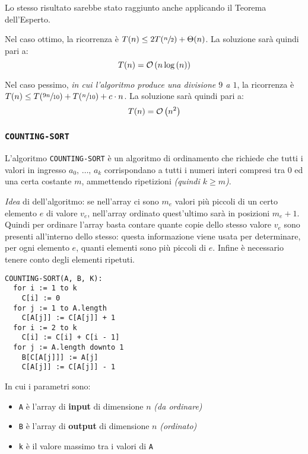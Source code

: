 \documentclass[italian, 10pt]{article}
\begin{document}
\bigskip
Lo stesso risultato sarebbe stato raggiunto anche applicando il Teorema dell'Esperto.

Nel caso ottimo, la ricorrenza è \(T(n) \leq 2T(\sfrac{n}{2}) + \Theta(n)\).
La soluzione sarà quindi pari a: \[ T(n) = \mathcal{O}\left(n \log{(n)}\right) \]

Nel caso pessimo, \textit{in cui l'algoritmo produce una divisione \(9\) a \(1\)}, la ricorrenza è \(T(n) \leq T(\sfrac{9n}{10}) + T(\sfrac{n}{10}) + c \cdot n\).
La soluzione sarà quindi pari a: \[ T(n) = \mathcal{O}\left(n^2\right) \]

\subsubsection{\texttt{COUNTING-SORT}}

L'algoritmo \texttt{COUNTING-SORT} è un algoritmo di ordinamento che richiede che tutti i valori in ingresso \(a_0,\, \ldots,\, a_k\) corrispondano a tutti i numeri interi compresi tra \(0\) ed una certa costante \(m\), ammettendo ripetizioni \textit{(quindi \(k \geq m\))}.

\textit{Idea} di dell'algoritmo:
se nell'array ci sono \(m_e\) valori più piccoli di un certo elemento \(e\) di valore \(v_e\), nell'array ordinato quest'ultimo sarà in posizioni \(m_e + 1\).
Quindi per ordinare l'array basta contare quante copie dello stesso valore \(v_e\) sono presenti all'interno dello stesso: questa informazione viene usata per determinare, per ogni elemento \(e\), quanti elementi sono più piccoli di \(e\).
Infine è necessario tenere conto degli elementi ripetuti.

\begin{lstlisting}[style=pseudocode, caption={Pseudocodice algorimo \texttt{COUNTING-SORT}}, label={lst:counting-sort}]
COUNTING-SORT(A, B, K):
  for i := 1 to k
    C[i] := 0
  for j := 1 to A.length
    C[A[j]] := C[A[j]] + 1
  for i := 2 to k
    C[i] := C[i] + C[i - 1]
  for j := A.length downto 1
    B[C[A[j]]] := A[j]
    C[A[j]] := C[A[j]] - 1
\end{lstlisting}

In cui i parametri sono:

\begin{itemize}
  \item \texttt{A} è l'array di \textbf{input} di dimensione \(n\) \textit{(da ordinare)}
  \item \texttt{B} è l'array di \textbf{output} di dimensione \(n\) \textit{(ordinato)}
  \item \texttt{k} è il valore massimo tra i valori di \texttt{A}
\end{itemize}
\end{document}
